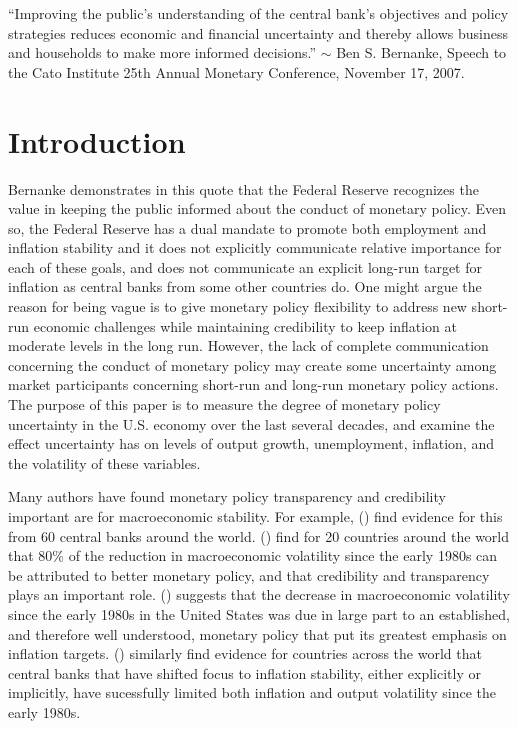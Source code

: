\documentclass[12pt]{article}
\newcommand{\citee}[1]{\citename{#1} (\citeyear{#1})}
\begin{document}
\noindent ``Improving the public's understanding of the central bank's objectives and policy strategies reduces economic and financial uncertainty and thereby allows business and households to make more informed decisions.''
$\sim$ Ben S. Bernanke, Speech to the Cato Institute 25th Annual Monetary Conference, November 17, 2007.

\section{Introduction}
Bernanke demonstrates in this quote that the Federal Reserve recognizes the value in keeping the public informed about the conduct of monetary policy.  Even so, the Federal Reserve has a dual mandate to promote both employment and inflation stability and it does not explicitly communicate relative importance for each of these goals, and does not communicate an explicit long-run target for inflation as central banks from some other countries do.  One might argue the reason for being vague is to give monetary policy flexibility to address new short-run economic challenges while maintaining credibility to keep inflation at moderate levels in the long run.  However, the lack of complete communication concerning the conduct of monetary policy may create some uncertainty among market participants concerning short-run and long-run monetary policy actions.  The purpose of this paper is to measure the degree of monetary policy uncertainty in the U.S. economy over the last several decades, and examine the effect uncertainty has on levels of output growth, unemployment, inflation, and the volatility of these variables.

Many authors have found monetary policy transparency and credibility important are for macroeconomic stability.  For example, \citee{cecchetti_krause2002} find evidence for this from 60 central banks around the world.  \citee{cecchetti2006} find for 20 countries around the world that 80\% of the reduction in macroeconomic volatility since the early 1980s can be attributed to better monetary policy, and that credibility and transparency plays an important role.  \citee{bernanke1997} suggests that the decrease in macroeconomic volatility since the early 1980s in the United States was due in large part to an established, and therefore well understood, monetary policy that put its greatest emphasis on inflation targets.  \citee{cecchetti_ehrmann2002} similarly find evidence for countries across the world that central banks that have shifted focus to inflation stability, either explicitly or implicitly, have sucessfully limited both inflation and output volatility since the early 1980s.
\end{document}
